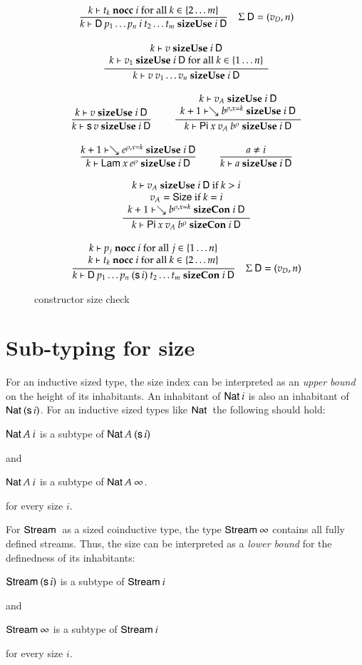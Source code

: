 \begin{figure}[htp]
\begin{gather*}
\ \dfrac{k\vdash t_k\mbox{ \textbf{nocc} }i \mbox { for all } k \in \{ 2 \ldots m\}}{k\vdash\mathsf{D} \: p_1 \ldots p_n \: i \: t_2 \ldots t_m\mbox{ \textbf{sizeUse} }i\:\mathsf{D}}
{\quad \Sigma \: \mathsf{D} = (v_D,n)}
\\[2ex]
\ \dfrac{\begin{array}[b]{c}k\vdash v\mbox{ \textbf{sizeUse} }i\:\mathsf{D}\\k\vdash v_1\mbox{ \textbf{sizeUse} }i\:\mathsf{D} \mbox { for all } k \in \{ 1 \ldots n\}\end{array}}{k\vdash v \: v_1 \ldots v_n\mbox{ \textbf{sizeUse} }i\:\mathsf{D}}
\\[2ex]
\ \dfrac{k\vdash v\mbox{ \textbf{sizeUse} }i\:\mathsf{D}}{k\vdash\mathsf{s}\, v\mbox{ \textbf{sizeUse} }i\:\mathsf{D}}
\qquad
\ \dfrac{\begin{array}[b]{c}k\vdash v_A\mbox{ \textbf{sizeUse} }i\:\mathsf{D}\\k+1\vdash\searrow b^{\rho,x=k}\mbox{ \textbf{sizeUse} }i\:\mathsf{D}\end{array}}{k\vdash\mathsf{Pi} \: x \: v_A \: b^{\rho}\mbox{ \textbf{sizeUse} }i\:\mathsf{D}}
\\[2ex]
\ \dfrac{k+1\vdash\searrow e^{\rho,x=k}\mbox{ \textbf{sizeUse} }i\:\mathsf{D}}{k\vdash\mathsf{Lam} \: x \: e^{\rho}\mbox{ \textbf{sizeUse} }i\:\mathsf{D}}
\qquad
\ \dfrac{a \neq i}{k\vdash a\mbox{ \textbf{sizeUse} }i\:\mathsf{D}}
\\[2ex]
\ \dfrac{\begin{array}[b]{c}k\vdash v_A\mbox{ \textbf{sizeUse} }i\:\mathsf{D} \mbox{ if } k > i\\v_A = \mathsf{Size} \mbox { if } k = i \\k+1\vdash\searrow b^{\rho,x=k}\mbox{ \textbf{sizeCon} }i\:\mathsf{D}\end{array}}{k\vdash\mathsf{Pi} \: x \: v_A \: b^{\rho}\mbox{ \textbf{sizeCon} }i\:\mathsf{D}}
\\[2ex]
\ \dfrac{\begin{array}[b]{c}k\vdash p_j\mbox{ \textbf{nocc} }i \mbox { for all } j \in \{ 1 \ldots n\}\\k\vdash t_k\mbox{ \textbf{nocc} }i \mbox { for all } k \in \{ 2 \ldots m\}\end{array}}{k\vdash\mathsf{D} \:p_1 \ldots p_n \: (\mathsf{s}\, i) \:t_2 \ldots t_m\mbox{ \textbf{sizeCon} }i\:\mathsf{D}}
{\quad \Sigma \: \mathsf{D} = (v_D,n)}
\end{gather*}
\caption{constructor size check}
\label{fsizecon}
\end{figure}


\section{Sub-typing for size}

For an inductive sized type, the size index can be interpreted as an \emph{upper bound} on the height of its inhabitants.
An inhabitant of $\mathsf{Nat}\: i$ is also an inhabitant of $\mathsf{Nat}\: (\mathsf{s}\, i)$. For an inductive sized types like $\mathsf{Nat}\:$ the following should hold:
\begin{bsp}
$\mathsf{Nat}\: A\: i$ is a subtype of $\mathsf{Nat}\: A \: (\mathsf{s}\, i)$  
\end{bsp}
and
\begin{bsp}
$\mathsf{Nat}\: A\: i$ is a subtype of $\mathsf{Nat}\: A \: \infty$.
\end{bsp}
for every size $i$.

For $\mathsf{Stream}\:$ as a sized coinductive type, the type $\mathsf{Stream}\: \infty$ contains all fully defined streams.
Thus, the size can be interpreted as a \emph{lower bound} for the definedness of its inhabitants:
\begin{bsp}
$\mathsf{Stream}\: (\mathsf{s}\, i) $ is a subtype of $\mathsf{Stream}\: i$
\end{bsp}
and
\begin{bsp}
$\mathsf{Stream}\: \infty$ is a subtype of $\mathsf{Stream}\: i$
\end{bsp}
for every size $i$.



